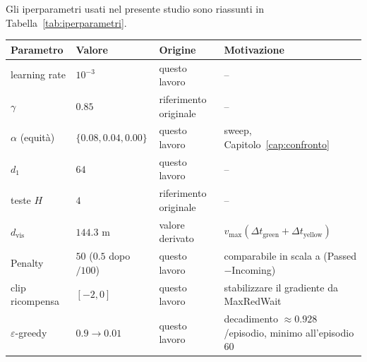 Gli iperparametri usati nel presente studio sono riassunti in
Tabella~\ref{tab:iperparametri}.

\begin{table}[htbp]
  \centering
  \footnotesize
  \begin{tabular}{@{}p{3.2cm}p{2.9cm}p{2.9cm}p{4.3cm}@{}}
    \toprule
    Parametro                    & Valore                                                              & Origine               & Motivazione                                                    \\
    \midrule
    learning rate                & $10^{-3}$                                                           & questo lavoro         & --                                                             \\
    $\gamma$                     & $0.85$                                                              & riferimento originale & --                                                             \\
    $\alpha$ (equità)            & $\{0.08, 0.04, 0.00\}$                                              & questo lavoro         & sweep, Capitolo~\ref{cap:confronto}                            \\
    $d_1$                        & $64$                                                                & questo lavoro         & --                                                             \\
    teste $H$                    & $4$                                                                 & riferimento originale & --                                                             \\
    $d_{\text{vis}}$             & $144.3$ m                                                           & valore derivato       & $v_{\max}(\Delta t_{\text{green}}{+}\Delta t_{\text{yellow}})$ \\
    Penalty                      & $50$ ($0.5$ dopo $/100$)                                            & questo lavoro         & comparabile in scala a (Passed$-$Incoming)                     \\
    clip ricompensa              & $[-2,0]$                                                            & questo lavoro         & stabilizzare il gradiente da MaxRedWait                        \\
    $\varepsilon$-greedy         & $0.9 \to 0.01$                                                      & questo lavoro         & decadimento $\approx 0.928$/episodio, minimo all'episodio 60   \\

\end{tabular}
\end{table}
